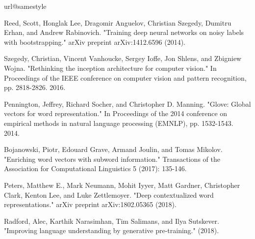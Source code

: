 \documentclass[11pt,dvipsnames]{article}
\begin{document}
\providecommand{\noopsort}[1]{}
\begin{thebibliography}{10}
\providecommand{\url}[1]{#1}
\csname url@samestyle\endcsname
\providecommand{\newblock}{\relax}
\providecommand{\bibinfo}[2]{#2}
\providecommand{\BIBentrySTDinterwordspacing}{\spaceskip=0pt\relax}
\providecommand{\BIBentryALTinterwordstretchfactor}{4}
\providecommand{\BIBentryALTinterwordspacing}{\spaceskip=\fontdimen2\font plus
\BIBentryALTinterwordstretchfactor\fontdimen3\font minus
  \fontdimen4\font\relax}
\providecommand{\BIBforeignlanguage}[2]{{%
\expandafter\ifx\csname l@#1\endcsname\relax
\typeout{** WARNING: IEEEtran.bst: No hyphenation pattern has been}%
\typeout{** loaded for the language `#1'. Using the pattern for}%
\typeout{** the default language instead.}%
\else
\language=\csname l@#1\endcsname
\fi
#2}}
\providecommand{\BIBdecl}{\relax}
\BIBdecl

Reed, Scott, Honglak Lee, Dragomir Anguelov, Christian Szegedy, Dumitru Erhan, and Andrew Rabinovich. "Training deep neural networks on noisy labels with bootstrapping." arXiv preprint arXiv:1412.6596 (2014).

Szegedy, Christian, Vincent Vanhoucke, Sergey Ioffe, Jon Shlens, and Zbigniew Wojna. "Rethinking the inception architecture for computer vision." In Proceedings of the IEEE conference on computer vision and pattern recognition, pp. 2818-2826. 2016.

Pennington, Jeffrey, Richard Socher, and Christopher D. Manning. "Glove: Global vectors for word representation." In Proceedings of the 2014 conference on empirical methods in natural language processing (EMNLP), pp. 1532-1543. 2014.

  
Bojanowski, Piotr, Edouard Grave, Armand Joulin, and Tomas Mikolov. "Enriching word vectors with subword information." Transactions of the Association for Computational Linguistics 5 (2017): 135-146.

Peters, Matthew E., Mark Neumann, Mohit Iyyer, Matt Gardner, Christopher Clark, Kenton Lee, and Luke Zettlemoyer. "Deep contextualized word representations." arXiv preprint arXiv:1802.05365 (2018).

Radford, Alec, Karthik Narasimhan, Tim Salimans, and Ilya Sutskever. "Improving language understanding by generative pre-training." (2018).



\end{thebibliography}
\end{document}

